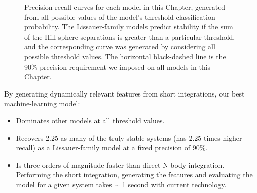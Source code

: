 \begin{figure}
 \centering {}
 \caption{
     Precision-recall curves for each model in this Chapter, generated from all possible values of the model's threshold classification probability.
     The Lissauer-family models predict stability if the sum of the Hill-sphere separations is greater than a particular threshold, and the corresponding curve was generated by considering all possible threshold values.
     The horizontal black-dashed line is the 90\% precision requirement we imposed on all models in this Chapter. 
    \label{prcurves}}
\end{figure}

By generating dynamically relevant features from short integrations, our best machine-learning model:
\begin{itemize}
	\item Dominates other models at all threshold values.
	\item Recovers 2.25 as many of the truly stable systems (has 2.25 times higher recall) as a Lissauer-family model at a fixed precision of 90\%.
	\item Is three orders of magnitude faster than direct N-body integration. Performing the short integration, generating the features and evaluating the model for a given system takes $\sim$ 1 second with current technology.
\end{itemize}

